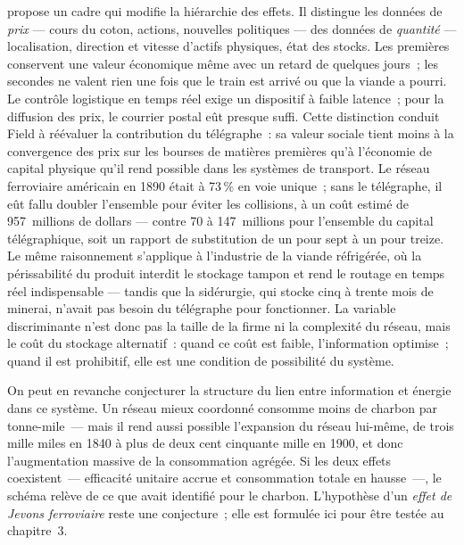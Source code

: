 %
\textcite{field_magnetic_1992} propose un cadre qui modifie la hiérarchie des effets. Il distingue les données de \emph{prix} --- cours du coton, actions, nouvelles politiques --- des données de \emph{quantité} --- localisation, direction et vitesse d'actifs physiques, état des stocks. Les premières conservent une valeur économique même avec un retard de quelques jours~; les secondes ne valent rien une fois que le train est arrivé ou que la viande a pourri. Le contrôle logistique en temps réel exige un dispositif à faible latence~; pour la diffusion des prix, le courrier postal eût presque suffi. Cette distinction conduit Field à réévaluer la contribution du télégraphe~: sa valeur sociale tient moins à la convergence des prix sur les bourses de matières premières qu'à l'économie de capital physique qu'il rend possible dans les systèmes de transport. Le réseau ferroviaire américain en 1890 était à 73\,\% en voie unique~; sans le télégraphe, il eût fallu doubler l'ensemble pour éviter les collisions, à un coût estimé de 957~millions de dollars --- contre 70 à 147~millions pour l'ensemble du capital télégraphique, soit un rapport de substitution de un pour sept à un pour treize. Le même raisonnement s'applique à l'industrie de la viande réfrigérée, où la périssabilité du produit interdit le stockage tampon et rend le routage en temps réel indispensable --- tandis que la sidérurgie, qui stocke cinq à trente mois de minerai, n'avait pas besoin du télégraphe pour fonctionner. La variable discriminante n'est donc pas la taille de la firme ni la complexité du réseau, mais le coût du stockage alternatif~: quand ce coût est faible, l'information optimise~; quand il est prohibitif, elle est une condition de possibilité du système.

%
On peut en revanche conjecturer la structure du lien entre information et énergie dans ce système. Un réseau mieux coordonné consomme moins de charbon par tonne-mile~--- mais il rend aussi possible l'expansion du réseau lui-même, de trois mille miles en 1840 à plus de deux cent cinquante mille en 1900, et donc l'augmentation massive de la consommation agrégée. Si les deux effets coexistent~--- efficacité unitaire accrue et consommation totale en hausse~---, le schéma relève de ce que \textcite{jevons_coal_1865} avait identifié pour le charbon. L'hypothèse d'un \emph{effet de Jevons ferroviaire} reste une conjecture~; elle est formulée ici pour être testée au chapitre~3.

